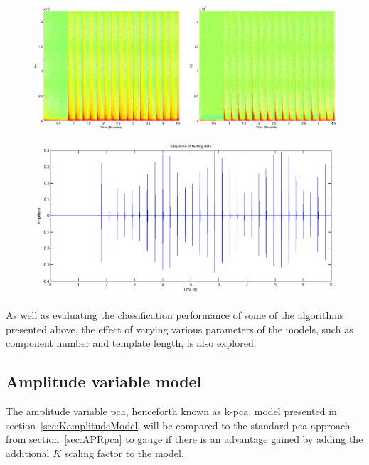 \DIFaddbegin \begin{figure}[!]
\centering
\includegraphics[width=410 px]{filterCompareSpectrogram.png}
\caption{}\label{fig:filterCompareSpectrogram}
\end{figure}


\begin{figure}[!]
\centering
\includegraphics[width=410 px]{dataSequence.png}
\caption{}\label{fig:dataSequence}
\end{figure}



\DIFaddend As well as evaluating the classification performance of some of the algorithms presented above, the effect of varying various parameters of the models, such as component number and template length, is also explored.

\subsection{Amplitude variable model}
The amplitude variable \DIFdelbegin {}\DIFdelend \DIFaddbegin \gls{pca}\DIFaddend , henceforth known as \DIFdelbegin {}\DIFdelend \DIFaddbegin \gls{k-pca}\DIFaddend , model presented in section~\ref{sec:KamplitudeModel} will be compared to the standard \DIFdelbegin {}\DIFdelend \DIFaddbegin \gls{pca}  \DIFaddend approach from section~\ref{sec:APRpca} to gauge if there is an advantage gained by adding the additional $K$ scaling factor to the model.


